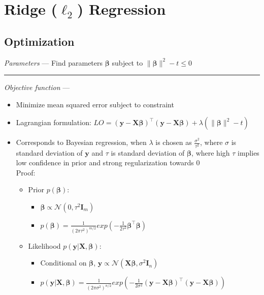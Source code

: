 \section{Ridge ($\ell_2$) Regression}
\subsection*{Optimization}
\emph{Parameters} --- Find parameters $\boldsymbol{\beta}$ subject to $\|\boldsymbol{\beta}\|^2 - t \leq 0$

{\color{lightgray}\hrule height 0.001mm}

\emph{Objective function} --- 
\begin{itemize}
    \item Minimize mean squared error subject to constraint
    \item Lagrangian formulation: $LO = ( \boldsymbol{y} - \boldsymbol{X}\boldsymbol{\beta})^\intercal( \boldsymbol{y} - \boldsymbol{X}\boldsymbol{\beta} ) + \lambda ( \|\boldsymbol{\beta}\|^2 - t )$
    \item Corresponds to Bayesian regression, when $\lambda$ is chosen as $\frac{\sigma^2}{\tau^2}$, where $\sigma$ is standard deviation of $\boldsymbol{y}$ and $\tau$ is standard deviation of $\boldsymbol{\beta}$, where high $\tau$ implies low confidence in prior and strong regularization towards $0$\\
    Proof:
    \begin{itemize}
        \item Prior $p( \boldsymbol{\beta} )$: 
        \begin{itemize}
            \item $\boldsymbol{\beta} \propto \mathcal{N}(0, \tau^2 \boldsymbol{I}_m)$
            \item $p( \boldsymbol{\beta} ) = \frac{ 1 }{ (2\pi\tau^2)^{m/2}} exp ( -\frac{1}{2\tau^2} \boldsymbol{\beta}^\intercal \boldsymbol{\beta} ) $
        \end{itemize}
        \item Likelihood $p( \boldsymbol{y} | \boldsymbol{X}, \boldsymbol{\beta} )$: 
        \begin{itemize}
            \item Conditional on $\boldsymbol{\beta}$, $\boldsymbol{y} \propto \mathcal{N}(\boldsymbol{X} \boldsymbol{\beta}, \sigma^2 \boldsymbol{I}_n)$
            \item $p( \boldsymbol{y} | \boldsymbol{X}, \boldsymbol{\beta} ) = \frac{ 1 }{ (2\pi\sigma^2)^{n/2}} exp ( -\frac{1}{2\sigma^2} (\boldsymbol{y} - \boldsymbol{X} \boldsymbol{\beta})^\intercal (\boldsymbol{y} - \boldsymbol{X} \boldsymbol{\beta}) ) $

\end{itemize}
\end{itemize}
\end{itemize}
